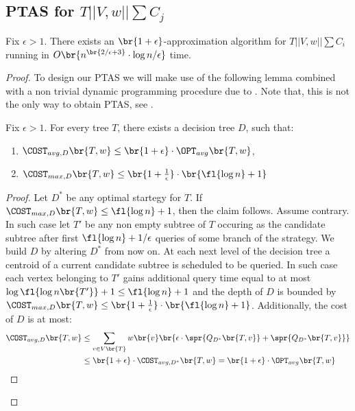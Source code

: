 \subsection{PTAS for $T||V,w||\sum C_j$}
\begin{theorem}
    Fix $\epsilon>1$. There exists an $\br{1+\epsilon}$-approximation algorithm for $T||V, w||\sum C_i$ running in $O\br{n^{\br{2/\epsilon+3}}\cdot \log n/\epsilon}$ time.
    \begin{proof}

To design our PTAS we will make use of the following lemma combined with a non trivial dynamic programming procedure due to \cite{Cicalese2014ImprovedApproxAvgTs,Angelidakis2018ShortestPQ, Berendsohn2024}. Note that, this is not the only way to obtain PTAS, see \cite{SplayTonT}.
\begin{lemma}\label{ptas_lemma}
Fix $\epsilon>1$. For every tree $T$, there exists a decision tree $D$, such that:
\begin{enumerate}
    \item $\COST_{avg,D}\br{T,w}\leq \br{1+\epsilon}\cdot\OPT_{avg}\br{T,w}$,
    \item $\COST_{max,D}\br{T,w}\leq \br{1+\frac{1}{\epsilon}}\cdot\br{\fl{\log n}+1}$
\end{enumerate} 
\begin{proof}
Let $D^*$ be any optimal startegy for $T$. If  $\COST_{max,D}\br{T,w}\leq \fl{\log n}+1$, then the claim follows. Assume contrary. In such case let $T'$ be any non empty subtree of $T$ occuring as the candidate subtree after first ${\fl{\log n}+1}/{\epsilon}$ queries of some branch of the strategy. We build $D$ by altering $D^*$ from now on. At each next level of the decision tree a centroid of a current candidate subtree is scheduled to be queried. In such case each vertex belonging to $T'$ gains additional query time equal to at most $\log \fl{\log n\br{T'}}+1\leq \fl{\log n}+1$ and the depth of $D$ is bounded by $\COST_{max,D}\br{T,w}\leq \br{1+\frac{1}{\epsilon}}\cdot\br{\fl{\log n}+1}$. Additionally, the cost of $D$ is at most:
\begin{align*}
    \COST_{avg,D}\br{T,w}&\leq 
\sum_{v \in V\br{T}}w\br{v}\br{\epsilon\cdot \spr{Q_{D^*}\br{T,v}}+\spr{Q_{D^*}\br{T,v}}}
\\&\leq
\br{1+\epsilon}\cdot \COST_{avg,D^*}\br{T,w}=
\br{1+\epsilon}\cdot\OPT_{avg}\br{T,w}
\end{align*}

\end{proof}
\end{lemma}


\end{proof}
\end{theorem}
